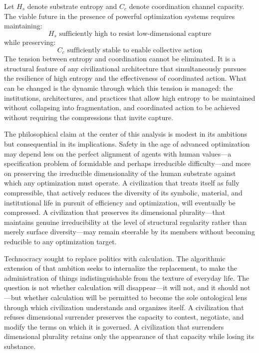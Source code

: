 \documentclass[12pt]{article}
\begin{document}
Let $H_s$ denote substrate entropy and $C_c$ denote coordination channel capacity. The viable future in the presence of powerful optimization systems requires maintaining:
\[
H_s \text{ sufficiently high to resist low-dimensional capture}
\]
while preserving:
\[
C_c \text{ sufficiently stable to enable collective action}
\]
The tension between entropy and coordination cannot be eliminated. It is a structural feature of any civilizational architecture that simultaneously pursues the resilience of high entropy and the effectiveness of coordinated action. What can be changed is the dynamic through which this tension is managed: the institutions, architectures, and practices that allow high entropy to be maintained without collapsing into fragmentation, and coordinated action to be achieved without requiring the compressions that invite capture.

The philosophical claim at the center of this analysis is modest in its ambitions but consequential in its implications. Safety in the age of advanced optimization may depend less on the perfect alignment of agents with human values---a specification problem of formidable and perhaps irreducible difficulty---and more on preserving the irreducible dimensionality of the human substrate against which any optimization must operate. A civilization that treats itself as fully compressible, that actively reduces the diversity of its symbolic, material, and institutional life in pursuit of efficiency and optimization, will eventually be compressed. A civilization that preserves its dimensional plurality---that maintains genuine irreducibility at the level of structural regularity rather than merely surface diversity---may remain steerable by its members without becoming reducible to any optimization target.

Technocracy sought to replace politics with calculation. The algorithmic extension of that ambition seeks to internalize the replacement, to make the administration of things indistinguishable from the texture of everyday life. The question is not whether calculation will disappear---it will not, and it should not---but whether calculation will be permitted to become the sole ontological lens through which civilization understands and organizes itself. A civilization that refuses dimensional surrender preserves the capacity to contest, negotiate, and modify the terms on which it is governed. A civilization that surrenders dimensional plurality retains only the appearance of that capacity while losing its substance.
\end{document}
